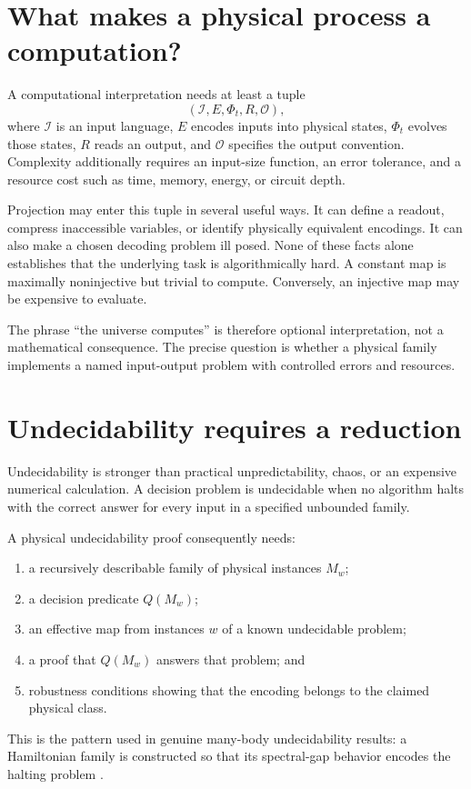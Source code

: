 \documentclass[11pt]{article}
\begin{document}
\section{What makes a physical process a computation?}

A computational interpretation needs at least a tuple
\[
 (\mathcal I,E,\Phi_t,R,\mathcal O),
\]
where \(\mathcal I\) is an input language, \(E\) encodes inputs into physical
states, \(\Phi_t\) evolves those states, \(R\) reads an output, and
\(\mathcal O\) specifies the output convention. Complexity additionally
requires an input-size function, an error tolerance, and a resource cost
such as time, memory, energy, or circuit depth.

Projection may enter this tuple in several useful ways. It can define a
readout, compress inaccessible variables, or identify physically equivalent
encodings. It can also make a chosen decoding problem ill posed. None of
these facts alone establishes that the underlying task is algorithmically
hard. A constant map is maximally noninjective but trivial to compute.
Conversely, an injective map may be expensive to evaluate.

The phrase ``the universe computes'' is therefore optional interpretation,
not a mathematical consequence. The precise question is whether a physical
family implements a named input-output problem with controlled errors and
resources.

\section{Undecidability requires a reduction}

Undecidability is stronger than practical unpredictability, chaos, or an
expensive numerical calculation. A decision problem is undecidable when no
algorithm halts with the correct answer for every input in a specified
unbounded family.

A physical undecidability proof consequently needs:
\begin{enumerate}[leftmargin=*]
\item a recursively describable family of physical instances \(M_w\);
\item a decision predicate \(Q(M_w)\);
\item an effective map from instances \(w\) of a known undecidable problem;
\item a proof that \(Q(M_w)\) answers that problem; and
\item robustness conditions showing that the encoding belongs to the
claimed physical class.
\end{enumerate}
This is the pattern used in genuine many-body undecidability results: a
Hamiltonian family is constructed so that its spectral-gap behavior encodes
the halting problem \cite{Cubitt2015,Bausch2020}.
\end{document}
